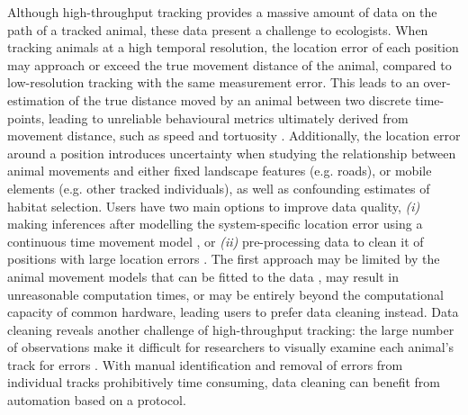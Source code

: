 \begin{refsection}
    Although high-throughput tracking provides a massive amount of data on the path of a tracked animal, these data present a challenge to ecologists.
    When tracking animals at a high temporal resolution, the location error of each position may approach or exceed the true movement distance of the animal, compared to low-resolution tracking with the same measurement error.
    This leads to an over-estimation of the true distance moved by an animal between two discrete time-points, leading to unreliable behavioural metrics ultimately derived from movement distance, such as speed and tortuosity \cite[see][]{ranacher2016, noonan2019, hurford2009, calenge2009}.
    Additionally, the location error around a position introduces uncertainty when studying the relationship between animal movements and either fixed landscape features (e.g. roads), or mobile elements (e.g. other tracked individuals), as well as confounding estimates of habitat selection.
    Users have two main options to improve data quality, \textit{(i)} making inferences after modelling the system-specific location error using a continuous time movement model \cite{fleming2014a, fleming2020, jonsen2003, jonsen2005, johnson2008, patterson2008, aspillaga2021}, or \textit{(ii)} pre-processing data to clean it of positions with large location errors \cite{bjorneraas2010}.
    The first approach may be limited by the animal movement models that can be fitted to the data \cite{fleming2014a, noonan2019, fleming2020}, may result in unreasonable computation times, or may be entirely beyond the computational capacity of common hardware, leading users to prefer data cleaning instead.
    Data cleaning reveals another challenge of high-throughput tracking: the large number of observations make it difficult for researchers to visually examine each animal's track for errors \cite{weiser2016, toledo2020}.
    With manual identification and removal of errors from individual tracks prohibitively time consuming, data cleaning can benefit from automation based on a protocol.


\end{refsection}

